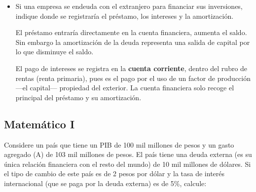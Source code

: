 \documentclass[a4paper]{article}
\begin{document}
\begin{itemize}
\begin{solution}
        \end{solution}

        \item[i)] Si una empresa se endeuda con el extranjero para financiar sus inversiones, indique donde se registraría el préstamo, los intereses y la amortización. 

        \begin{solution}
            El préstamo entraría directamente en la cuenta financiera, aumenta el saldo. Sin embargo la amortización de la deuda representa una salida de capital por lo que disminuye el saldo.

            El pago de intereses se registra en la \textbf{cuenta corriente}, dentro del rubro de rentas (renta primaria), pues es el pago por el uso de un factor de producción —el capital— propiedad del exterior. La cuenta financiera solo recoge el principal del préstamo y su amortización.
        \end{solution}
    
    \end{itemize}



\subsection{Matemático I}

 Considere un país que tiene un PIB de 100 mil millones de pesos y un gasto agregado (A) de 103 mil millones de pesos. El país tiene una deuda externa (es su única relación financiera con el resto del mundo) de 10 mil millones de dólares. Si el tipo de cambio de este país es de 2 pesos por dólar y la tasa de interés internacional (que
se paga por la deuda externa) es de 5\%, calcule:
\end{document}
